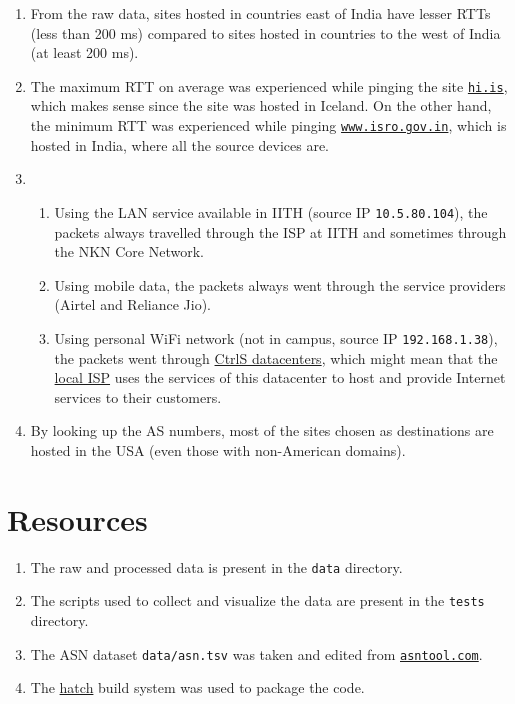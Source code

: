 \documentclass[journal,12pt,twocolumn]{IEEEtran}
\begin{document}
\begin{enumerate}
     \item From the raw data, sites hosted in countries east of India have
     lesser RTTs (less than 200 ms) compared to sites hosted in countries to the
     west of India (at least 200 ms).
     \item The maximum RTT on average was experienced while pinging the site
     \href{https://www.hi.is/}{\texttt{hi.is}}, which makes sense since the site
     was hosted in Iceland. On the other hand, the minimum RTT was experienced
     while pinging \href{https://www.isro.gov.in/}{\texttt{www.isro.gov.in}},
     which is hosted in India, where all the source devices are.
     \item 
     \begin{enumerate}
          \item Using the LAN service available in IITH (source IP
          \texttt{10.5.80.104}), the packets always travelled through the ISP at
          IITH and sometimes through the NKN Core Network.
          \item Using mobile data, the packets always went through the service
          providers (Airtel and Reliance Jio).
          \item Using personal WiFi network (not in campus, source IP
          \texttt{192.168.1.38}), the packets went through
          \href{https://www.ctrls.in/}{CtrlS datacenters}, which might mean that
          the \href{https://reachtele.net/}{local ISP} uses the services of this
          datacenter to host and provide Internet services to their customers.
     \end{enumerate}
     \item By looking up the AS numbers, most of the sites chosen as
     destinations are hosted in the USA (even those with non-American domains).
\end{enumerate}

\section{Resources}

\begin{enumerate}
     \item The raw and processed data is present in the \texttt{data} directory.
     \item The scripts used to collect and visualize the data are present in the
     \texttt{tests} directory.
     \item The ASN dataset \texttt{data/asn.tsv} was taken and edited from
     \href{https://asntool.com/}{\texttt{asntool.com}}.
     \item The \href{https://hatch.pypa.io/latest/}{hatch} build system was used
     to package the code.
\end{enumerate}
\end{document}
